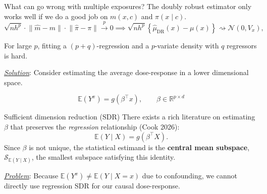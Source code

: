 \documentclass[
  ignorenonframetext,
  aspectratio=169,
  11pt]{beamer}
\begin{document}
\begin{frame}{What can go wrong with multiple exposures?}
\protect{}\label{what-can-go-wrong-with-multiple-exposures}
The doubly robust estimator only works well if we do a good job on
\(m(x,c)\) and \(\pi(x\mid c)\). \[
\sqrt{nh^p} \cdot \lVert \widehat{m}-m\rVert\cdot \lVert\widehat{\pi} - \pi\rVert \xrightarrow{p} 0 \implies
\sqrt{nh^{p}}
\left\{\widehat{\mu}_{\mathrm{DR}}(x)-\mu(x)\right\}
\rightsquigarrow \mathcal{N}(0,V_x), \qquad 
\]

\pause

For large \(p\), fitting a \((p+q)\)-regression and a \(p\)-variate
density with \(q\) regressors is hard.

\pause

\underline{\textit{Solution}}: Consider estimating the average
dose-response in a lower dimensional space.

\[
\boxed{\mathbb{E}(Y^x)=g(\beta^\top x), \qquad \beta \in \mathbb{R}^{p \times d}}
\]
\end{frame}

\begin{frame}{Sufficient dimension reduction (SDR)}
\protect{}\label{sufficient-dimension-reduction-sdr}
There exists a rich literature on estimating \(\beta\) that preserves
the \textit{regression} relationship {\color{emoryblue}(Cook 2026)}: \[
\mathbb{E}(Y\mid X) = g(\beta^\top X).
\] Since \(\beta\) is not unique, the statistical estimand is the
\textbf{central mean subspace}, \(\mathcal{S}_{\mathbb{E}(Y\mid X)}\),
the smallest subspace satisfying this identity.

\pause

\vspace{0.34cm}

\underline{\textit{Problem}}: Because
\(\mathbb{E}(Y^x) \neq \mathbb{E}(Y\mid X=x)\) due to confounding, we
cannot directly use regression SDR for our causal dose-response.
\end{frame}
\end{document}
